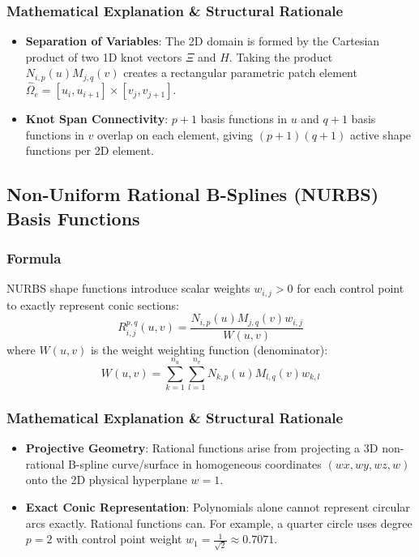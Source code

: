\subsubsection{Mathematical Explanation \& Structural Rationale}
\begin{itemize}
    \item \textbf{Separation of Variables}: The 2D domain is formed by the Cartesian product of two 1D knot vectors $\Xi$ and $H$. Taking the product $N_{i,p}(u) M_{j,q}(v)$ creates a rectangular parametric patch element $\hat{\Omega}_e = [u_i, u_{i+1}] \times [v_j, v_{j+1}]$.
    \item \textbf{Knot Span Connectivity}: $p+1$ basis functions in $u$ and $q+1$ basis functions in $v$ overlap on each element, giving $(p+1)(q+1)$ active shape functions per 2D element.
\end{itemize}

\hr

\subsection{Non-Uniform Rational B-Splines (NURBS) Basis Functions}

\subsubsection{Formula}
NURBS shape functions introduce scalar weights $w_{i,j} > 0$ for each control point to exactly represent conic sections:
\begin{equation}
R_{i,j}^{p,q}(u, v) = \frac{N_{i,p}(u) M_{j,q}(v) w_{i,j}}{W(u, v)}
\end{equation}
where $W(u, v)$ is the weight weighting function (denominator):
\begin{equation}
W(u, v) = \sum_{k=1}^{n_u} \sum_{l=1}^{n_v} N_{k,p}(u) M_{l,q}(v) w_{k,l}
\end{equation}

\subsubsection{Mathematical Explanation \& Structural Rationale}
\begin{itemize}
    \item \textbf{Projective Geometry}: Rational functions arise from projecting a 3D non-rational B-spline curve/surface in homogeneous coordinates $(w x, w y, w z, w)$ onto the 2D physical hyperplane $w = 1$.
    \item \textbf{Exact Conic Representation}: Polynomials alone cannot represent circular arcs exactly. Rational functions can. For example, a quarter circle uses degree $p=2$ with control point weight $w_1 = \frac{1}{\sqrt{2}} \approx 0.7071$.
\end{itemize}

